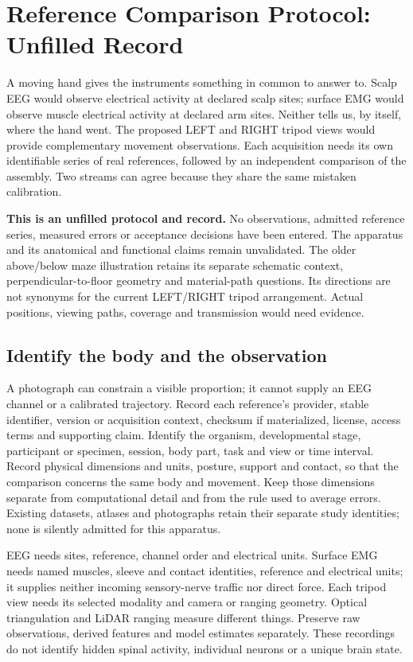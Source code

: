 \section{Reference Comparison Protocol: Unfilled Record}
\label{app:reference-comparison-protocol}

A moving hand gives the instruments something in common to answer to. Scalp
EEG would observe electrical activity at declared scalp sites; surface EMG
would observe muscle electrical activity at declared arm sites. Neither tells
us, by itself, where the hand went. The proposed LEFT and RIGHT tripod views
would provide complementary movement observations. Each acquisition needs its
own identifiable series of real references, followed by an independent
comparison of the assembly. Two streams can agree because they share the same
mistaken calibration.

\textbf{This is an unfilled protocol and record.} No observations, admitted
reference series, measured errors or acceptance decisions have been entered.
The apparatus and its anatomical and functional claims remain unvalidated.
The older above/below maze illustration retains its separate schematic
context, perpendicular-to-floor geometry and material-path questions. Its
directions are not synonyms for the current LEFT/RIGHT tripod arrangement.
Actual positions, viewing paths, coverage and transmission would need evidence.

\subsection*{Identify the body and the observation}

A photograph can constrain a visible proportion; it cannot supply an EEG
channel or a calibrated trajectory. Record each reference's provider, stable
identifier, version or acquisition context, checksum if materialized, license,
access terms and supporting claim. Identify the organism, developmental stage,
participant or specimen, session, body part, task and view or time interval.
Record physical dimensions and units, posture, support and contact, so that the
comparison concerns the same body and movement. Keep those dimensions separate
from computational detail and from the rule used to average errors. Existing
datasets, atlases and photographs retain their separate study identities;
none is silently admitted for this apparatus.

EEG needs sites, reference, channel order and electrical units. Surface EMG
needs named muscles, sleeve and contact identities, reference and electrical
units; it supplies neither incoming sensory-nerve traffic nor direct force.
Each tripod view needs its selected modality and camera or ranging geometry.
Optical triangulation and LiDAR ranging measure different things. Preserve raw
observations, derived features and model estimates separately. These recordings
do not identify hidden spinal activity, individual neurons or a unique brain state.

